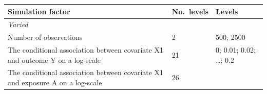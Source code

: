 \documentclass[10,a4paperpaper,]{article}
\begin{document}
\begin{longtable}[]{@{}lll@{}}
\toprule
\begin{minipage}[b]{0.37\columnwidth}\raggedright
Simulation factor\strut
\end{minipage} & \begin{minipage}[b]{0.12\columnwidth}\raggedright
No.~levels\strut
\end{minipage} & \begin{minipage}[b]{0.43\columnwidth}\raggedright
Levels\strut
\end{minipage}\tabularnewline
\midrule
\endhead
\begin{minipage}[t]{0.37\columnwidth}\raggedright
\emph{Varied}\strut
\end{minipage} & \begin{minipage}[t]{0.12\columnwidth}\raggedright
\strut
\end{minipage} & \begin{minipage}[t]{0.43\columnwidth}\raggedright
\strut
\end{minipage}\tabularnewline
\begin{minipage}[t]{0.37\columnwidth}\raggedright
Number of observations\strut
\end{minipage} & \begin{minipage}[t]{0.12\columnwidth}\raggedright
2\strut
\end{minipage} & \begin{minipage}[t]{0.43\columnwidth}\raggedright
500; 2500\strut
\end{minipage}\tabularnewline
\begin{minipage}[t]{0.37\columnwidth}\raggedright
The conditional association between covariate X1 and outcome Y on a
log-scale\strut
\end{minipage} & \begin{minipage}[t]{0.12\columnwidth}\raggedright
21\strut
\end{minipage} & \begin{minipage}[t]{0.43\columnwidth}\raggedright
0; 0.01; 0.02; \ldots; 0.2\strut
\end{minipage}\tabularnewline
\begin{minipage}[t]{0.37\columnwidth}\raggedright
The conditional association between covariate X1 and exposure A on a
log-scale\strut
\end{minipage} & \begin{minipage}[t]{0.12\columnwidth}\raggedright
26\strut
\end{minipage} & \begin{minipage}[t]{0.43\columnwidth}\raggedright

\end{minipage}
\end{longtable}
\end{document}
